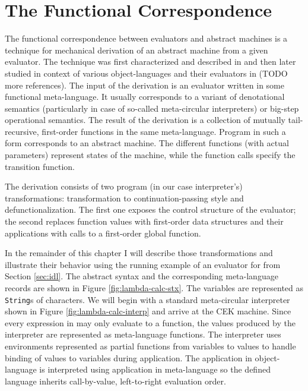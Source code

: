 \chapter{The Functional Correspondence}\label{chapter:functional-correspondence}
The functional correspondence between evaluators and abstract machines is a technique for mechanical derivation of an abstract machine from a given evaluator.
The technique was first characterized and described in \cite{functional-correspondence} and then later studied in context of various object-languages and their evaluators in (TODO more references).
The input of the derivation is an evaluator written in some functional meta-language.
It usually corresponds to a variant of denotational semantics (particularly in case of so-called meta-circular interpreters) or big-step operational semantics.
The result of the derivation is a collection of mutually tail-recursive, first-order functions in the same meta-language.
Program in such a form corresponds to an abstract machine.
The different functions (with actual parameters) represent states of the machine, while the function calls specify the transition function.

The derivation consists of two program (in our case interpreter's) transformations: transformation to continuation-passing style and defunctionalization.
The first one exposes the control structure of the evaluator; the second replaces function values with first-order data structures and their applications with calls to a first-order global function.

In the remainder of this chapter I will describe those transformations and illustrate their behavior using the running example of an evaluator for \LC{} from Section \ref{sec:idl}.
The abstract syntax and the corresponding meta-language records are shown in Figure \ref{fig:lambda-calc-stx}.
The variables are represented as \lstinline!String!s of characters.
We will begin with a standard meta-circular interpreter shown in Figure \ref{fig:lambda-calc-interp} and arrive at the CEK machine.
Since every expression in \LC{} may only evaluate to a function, the values produced by the interpreter are represented as meta-language functions.
The interpreter uses environments represented as partial functions from variables to values to handle binding of values to variables during application.
The application in object-language is interpreted using application in meta-language so the defined language inherits call-by-value, left-to-right evaluation order.


